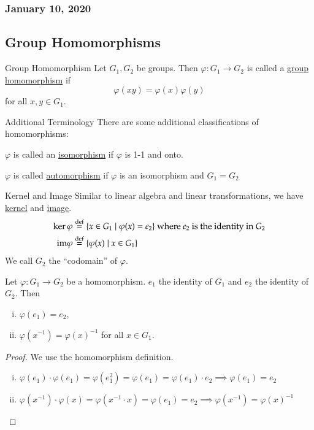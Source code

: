 \subsubsection*{January 10, 2020}
\subsection{Group Homomorphisms}
\begin{defn}{Group Homomorphism}
Let $G_1, G_2$ be groups. Then $\varphi: G_1\to G_2$ is called a \ul{group homomorphism} if
\begin{equation}
	\varphi(xy) = \varphi(x) \varphi(y)
\end{equation}
for all $x,y\in G_1$. 
\end{defn}
\begin{defn}{Additional Terminology}
There are some additional classifications of homomorphisms: 

$\varphi$ is called an \ul{isomorphism} if $\varphi$ is 1-1 and onto. 

$\varphi$ is called \ul{automorphism} if $\varphi$ is an isomorphism and $G_1=G_2$
\end{defn}

\begin{defn}{Kernel and Image}
Similar to linear algebra and linear transformations, we have \ul{kernel} and \ul{image}. 
\begin{align*}
\ker \varphi &\overset{\text{def}}{=} \{x\in G_1\mid \varphi(x)=e_2\} \text{ where $e_2$ is the identity in $G_2$} \\
\mathrm{im} \varphi &\overset{\text{def}}{=} \{\varphi(x)\mid x\in G_1\}
\end{align*}
We call $G_2$ the ``codomain'' of $\varphi$. 
\end{defn}

\begin{proposition}
	Let $\varphi: G_1\to G_2$ be a homomorphism. $e_1$ the identity of $G_1$ and $e_2$ the identity of $G_2$. Then
	\begin{enumerate}[(i)]
		\item $\varphi(e_1)=e_2$,
		\item $\varphi(x^{-1}) = \varphi(x)^{-1}$ for all $x\in G_1$.
	\end{enumerate}
\end{proposition}

\begin{proof}
We use the homomorphism definition. 
\begin{enumerate}[(i)]
	\item $\varphi(e_1)\cdot \varphi(e_1) = \varphi (e_1^2) = \varphi (e_1) = \varphi (e_1)\cdot e_2\implies \varphi(e_1)=e_2$
	\item $\varphi(x^{-1})\cdot \varphi(x) = \varphi(x^{-1}\cdot x) = \varphi(e_1) = e_2\implies \varphi(x^{-1}) = \varphi(x)^{-1}$
\end{enumerate}
\end{proof}

